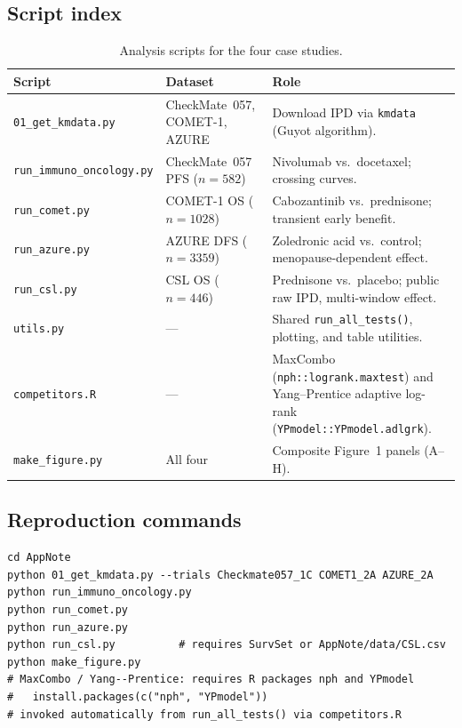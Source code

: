 \documentclass[11pt]{article}
\begin{document}
\subsection*{Script index}

\begin{table}[h]
  \centering
  \caption{Analysis scripts for the four case studies.}
  \label{tab:scripts}
  \small
  \begin{tabular}{@{}llp{6.8cm}@{}}
    \toprule
    Script & Dataset & Role \\
    \midrule
    \texttt{01\_get\_kmdata.py} & CheckMate~057, COMET-1, AZURE &
      Download IPD via \texttt{kmdata} (Guyot algorithm). \\
    \texttt{run\_immuno\_oncology.py} & CheckMate~057 PFS ($n=582$) &
      Nivolumab vs.\ docetaxel; crossing curves. \\
    \texttt{run\_comet.py} & COMET-1 OS ($n=1028$) &
      Cabozantinib vs.\ prednisone; transient early benefit. \\
    \texttt{run\_azure.py} & AZURE DFS ($n=3359$) &
      Zoledronic acid vs.\ control; menopause-dependent effect. \\
    \texttt{run\_csl.py} & CSL OS ($n=446$) &
      Prednisone vs.\ placebo; public raw IPD, multi-window effect. \\
    \texttt{utils.py} & --- &
      Shared \texttt{run\_all\_tests()}, plotting, and table utilities. \\
    \texttt{competitors.R} & --- &
      MaxCombo (\texttt{nph::logrank.maxtest}) and Yang--Prentice
      adaptive log-rank (\texttt{YPmodel::YPmodel.adlgrk}). \\
    \texttt{make\_figure.py} & All four &
      Composite Figure~1 panels (A--H). \\
    \bottomrule
  \end{tabular}
\end{table}

\subsection*{Reproduction commands}

\begin{lstlisting}
cd AppNote
python 01_get_kmdata.py --trials Checkmate057_1C COMET1_2A AZURE_2A
python run_immuno_oncology.py
python run_comet.py
python run_azure.py
python run_csl.py          # requires SurvSet or AppNote/data/CSL.csv
python make_figure.py
# MaxCombo / Yang--Prentice: requires R packages nph and YPmodel
#   install.packages(c("nph", "YPmodel"))
# invoked automatically from run_all_tests() via competitors.R
\end{lstlisting}
\end{document}
